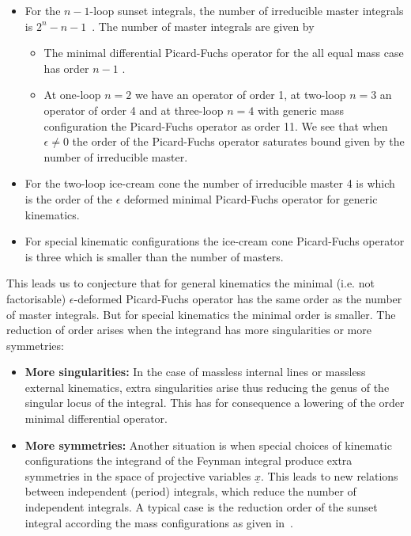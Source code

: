 \documentclass[a4paper,12pt]{article}
\numberwithin{equation}{section}
\numberwithin{figure}{section}
\begin{document}
\begin{itemize}
	\item  For the $n-1$-loop
	sunset integrals, the number of irreducible master integrals 
	is $2^{n}-n-1$~\cite{Kalmykov:2012rr,Bitoun:2017nre}. The number of  master integrals are given by 
%
%	
	\begin{itemize}  \item The minimal differential Picard-Fuchs operator for the all
		equal mass case has order  $n-1$ .
		\item At one-loop $n=2$ we have an operator of order 1, at two-loop
		$n=3$ an operator of order 4 and at three-loop $n=4$ with generic
		mass configuration the Picard-Fuchs operator
		as   order 11.  We see that when $\epsilon\neq0$  the order of the
		Picard-Fuchs operator saturates bound given by the number of
		irreducible master.
	\end{itemize}
	\item For the two-loop ice-cream cone the number of irreducible
	master 4 is which is the order of the $\epsilon$ deformed minimal Picard-Fuchs
	operator for generic kinematics.
        \item For special kinematic configurations  the ice-cream cone
          Picard-Fuchs operator  is three which is smaller than the
          number of masters.
\end{itemize}
This leads us to conjecture that 
 for general kinematics the minimal (i.e. not
factorisable) $\epsilon$-deformed Picard-Fuchs operator has 
the same order
as the number of master integrals. But for special kinematics the minimal
order is smaller.
%
The reduction of order arises when the integrand has more
singularities or more symmetries:
\begin{itemize}
  \item {\bf More singularities:} In the case of
massless internal lines or massless external kinematics, extra
singularities arise thus reducing the genus of the
singular locus of the integral. This has for  consequence a lowering
of the order  minimal differential operator. 
\item {\bf More symmetries:}
Another situation is when special choices of kinematic
configurations the integrand of the Feynman integral produce extra
symmetries in the space of projective variables $\underline
x$. This leads to new relations between independent (period) integrals, which reduce the number of independent integrals. A typical case is the
reduction order of the sunset integral according the mass
configurations as given in~\cite{Bloch:2014qca,Lairez:2022zkj,Bonisch:2021yfw,Bonisch:2020qmm,Pogel:2022vat}.
\end{itemize}
\end{document}
